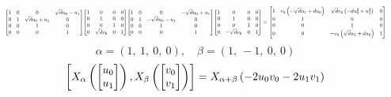 \documentclass[11pt]{article}
\theoremstyle{definition}
\begin{document}
\[
\scaletoalign{\textwidth}{{\left[\begin{matrix}1 & 0 & 0 & \sqrt{d} u_{0} - u_{1}\\0 & 1 & \sqrt{d} u_{0} + u_{1} & 0\\0 & 0 & 1 & 0\\0 & 0 & 0 & 1\end{matrix}\right]} {\left[\begin{matrix}1 & 0 & 0 & 0\\0 & 1 & 0 & 0\\0 & 0 & 1 & 0\\0 & \sqrt{d} v_{0} & 0 & 1\end{matrix}\right]} {\left[\begin{matrix}1 & 0 & 0 & - \sqrt{d} u_{0} + u_{1}\\0 & 1 & - \sqrt{d} u_{0} - u_{1} & 0\\0 & 0 & 1 & 0\\0 & 0 & 0 & 1\end{matrix}\right]} {\left[\begin{matrix}1 & 0 & 0 & 0\\0 & 1 & 0 & 0\\0 & 0 & 1 & 0\\0 & - \sqrt{d} v_{0} & 0 & 1\end{matrix}\right]} = {\left[\begin{matrix}1 & v_{0} \left(- \sqrt{d} u_{1} + d u_{0}\right) & \sqrt{d} v_{0} \left(- d u_{0}^{2} + u_{1}^{2}\right) & 0\\0 & 1 & 0 & 0\\0 & 0 & 1 & 0\\0 & 0 & - v_{0} \left(\sqrt{d} u_{1} + d u_{0}\right) & 1\end{matrix}\right]}}
\]
\[
\alpha = \left( 1, \  1, \  0, \  0\right), \quad \beta = \left( 1, \  -1, \  0, \  0\right)
\]
\[
\scaletoalign{\textwidth}{\left[ X_{\alpha}\left(\left[\begin{matrix}u_{0}\\u_{1}\end{matrix}\right]\right), X_{\beta}\left(\left[\begin{matrix}v_{0}\\v_{1}\end{matrix}\right]\right) \right] = X_{\alpha + \beta}\left(- 2 u_{0} v_{0} - 2 u_{1} v_{1}\right)}
\]
\end{document}
